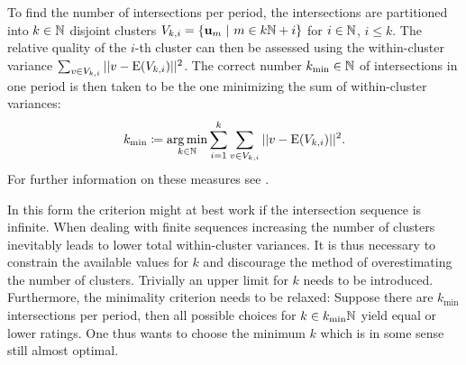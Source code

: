 To find the number of intersections per period, the intersections are partitioned into $k \in \mathbb{N}$ disjoint clusters $V_{k,i} = \{ \textbf{u}_m\ |\ m \in k\mathbb{N}+i \}$ for $i \in \mathbb{N}$, $i \le k$.
The relative quality of the $i$-th cluster can then be assessed using the within-cluster variance $\sum_{v \in V_{k,i} } ||v - \operatorname{E}(V_{k,i})||^2$.
The correct number $k_{\text{min}} \in \mathbb{N}$ of intersections in one period is then taken to be the one minimizing the sum of within-cluster variances:
\[
	k_\text{min} \coloneqq \operatorname*{arg\,min}_{k \in \mathbb{N}} \sum_{i = 1}^k \sum_{v \in V_{k,i} } ||v - \operatorname{E}(V_{k,i})||^2 \text.
\]
For further information on these measures see \cite{halkidi2001clustering}. %

In this form the criterion might at best work if the intersection sequence is infinite.
When dealing with finite sequences increasing the number of clusters inevitably leads to lower total within-cluster variances.
It is thus necessary to constrain the available values for $k$ and discourage the method of overestimating the number of clusters.
Trivially an upper limit for $k$ needs to be introduced.
Furthermore, the minimality criterion needs to be relaxed: Suppose there are $k_\text{min}$ intersections per period, then all possible choices for $k \in k_\text{min}\mathbb{N}$ yield equal or lower ratings.
One thus wants to choose the minimum $k$ which is in some sense still almost optimal.